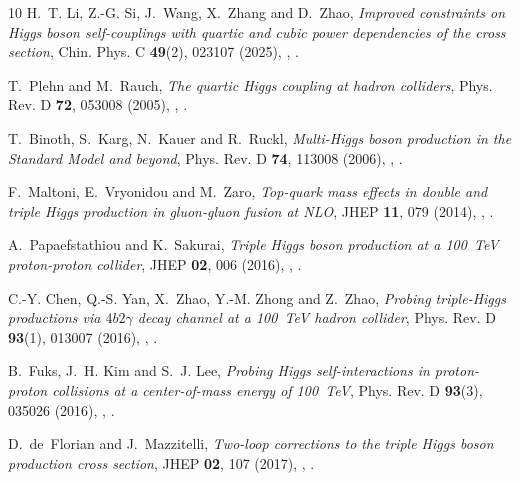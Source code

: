 \documentclass{SciPost}
\begin{document}
\begin{thebibliography}{10}
H.~T. Li, Z.-G. Si, J.~Wang, X.~Zhang and D.~Zhao,
\newblock \emph{{Improved constraints on Higgs boson self-couplings with quartic and cubic power dependencies of the cross section}},
\newblock Chin. Phys. C \textbf{49}(2), 023107 (2025),
\newblock {},
\newblock {}.

T.~Plehn and M.~Rauch,
\newblock \emph{{The quartic Higgs coupling at hadron colliders}},
\newblock Phys. Rev. D \textbf{72}, 053008 (2005),
\newblock {},
\newblock {}.

T.~Binoth, S.~Karg, N.~Kauer and R.~Ruckl,
\newblock \emph{{Multi-Higgs boson production in the Standard Model and beyond}},
\newblock Phys. Rev. D \textbf{74}, 113008 (2006),
\newblock {},
\newblock {}.

F.~Maltoni, E.~Vryonidou and M.~Zaro,
\newblock \emph{{Top-quark mass effects in double and triple Higgs production in gluon-gluon fusion at NLO}},
\newblock JHEP \textbf{11}, 079 (2014),
\newblock {},
\newblock {}.

A.~Papaefstathiou and K.~Sakurai,
\newblock \emph{{Triple Higgs boson production at a 100~TeV proton-proton collider}},
\newblock JHEP \textbf{02}, 006 (2016),
\newblock {},
\newblock {}.

C.-Y. Chen, Q.-S. Yan, X.~Zhao, Y.-M. Zhong and Z.~Zhao,
\newblock \emph{{Probing triple-Higgs productions via $4b2\gamma$ decay channel at a 100~TeV hadron collider}},
\newblock Phys. Rev. D \textbf{93}(1), 013007 (2016),
\newblock {},
\newblock {}.

B.~Fuks, J.~H. Kim and S.~J. Lee,
\newblock \emph{{Probing Higgs self-interactions in proton-proton collisions at a center-of-mass energy of 100~TeV}},
\newblock Phys. Rev. D \textbf{93}(3), 035026 (2016),
\newblock {},
\newblock {}.

D.~de~Florian and J.~Mazzitelli,
\newblock \emph{{Two-loop corrections to the triple Higgs boson production cross section}},
\newblock JHEP \textbf{02}, 107 (2017),
\newblock {},
\newblock {}.


\end{thebibliography}
\end{document}
